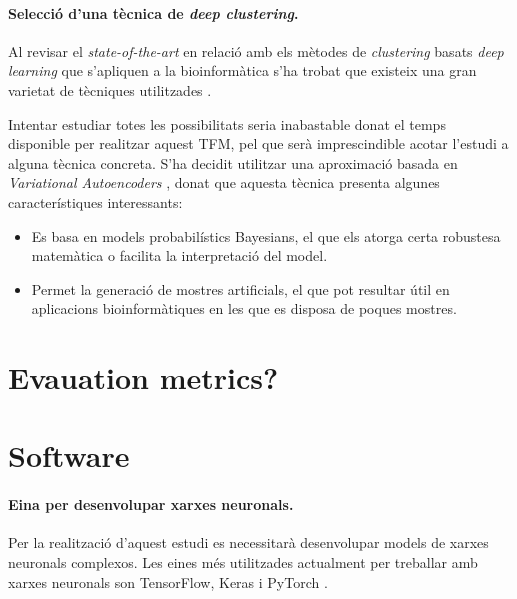 \documentclass[CAT,BIB]{TFUOC}%
\begin{document}
        \paragraph{Selecció d'una tècnica de \textit{deep clustering}.}

            Al revisar el \textit{state-of-the-art} en relació amb els mètodes de \textit{clustering} basats \textit{deep learning} que s'apliquen a la bioinformàtica s'ha trobat que existeix una gran varietat de tècniques utilitzades \citep{Min2018, Karim2021, Masood2015}.

            Intentar estudiar totes les possibilitats seria inabastable donat el temps disponible per realitzar aquest TFM, pel que serà imprescindible acotar l'estudi a alguna tècnica concreta. S'ha decidit utilitzar una aproximació basada en \textit{Variational Autoencoders} \citep{Kingma2019}, donat que aquesta tècnica presenta algunes característiques interessants:

            \begin{itemize}
                \item Es basa en models probabilístics Bayesians, el que els atorga certa robustesa matemàtica o facilita la interpretació del model.
                \item Permet la generació de mostres artificials, el que pot resultar útil en aplicacions bioinformàtiques en les que es disposa de poques mostres.
            \end{itemize}

    \section{Evauation metrics?}
    \label{s:???}

    \section{Software}
    \label{s:software}

        \paragraph{Eina per desenvolupar xarxes neuronals.}

            Per la realització d'aquest estudi es necessitarà desenvolupar models de xarxes neuronals complexos. Les eines més utilitzades actualment per treballar amb xarxes neuronals son TensorFlow, Keras i PyTorch \citep{Kaggle2021}.
\end{document}
